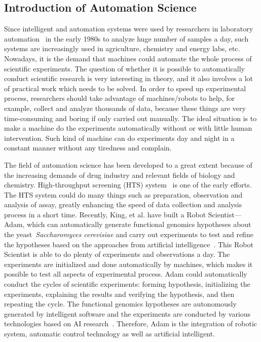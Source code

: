 \subsection{Introduction of Automation Science}

Since intelligent and automation systems were used by researchers in laboratory automation~\cite{Sasaki_1998} in the early 1980s to analyze huge number of samples a day, such systems are increasingly used in agriculture, chemistry and energy labs, etc. Nowadays, it is the demand that machines could automate the whole process of scientific experiments. The question of whether it is possible to automatically conduct scientific research is very interesting in theory, and it also involves a lot of practical work which needs to be solved. In order to speed up experimental process, researchers should take advantage of machines/robots to help, for example, collect and analyze thousands of data, because these things are very time-consuming and boring if only carried out manually. The ideal situation is to make a machine do the experiments automatically without or with little human intervention. Such kind of machine can do experiments day and night in a constant manner without any tiredness and complain.
          
The field of automation science has been developed to a great extent because of the increasing demands of drug industry and relevant fields of biology and chemistry. High-throughput screening (HTS) system~\cite{Persidis_1998} is one of the early efforts. The HTS system could do many things such as preparation, observation and analysis of assay, greatly enhancing the speed of data collection and analysis process in a short time. Recently, King, et al. have built a Robot Scientist---Adam,  which can automatically generate functional genomics hypotheses about the yeast~\textit{Saccharomyces cerevisiae} and carry out experiments to test and refine the hypotheses based on the approaches from artificial intelligence~\cite{King_2004, King_2009}. This Robot Scientist is able to do plenty of experiments and observations a day. The experiments are initialized and done automatically by machines, which makes it possible to test all aspects of experimental process. Adam could automatically conduct the cycles of scientific experiments: forming hypothesis, initializing the experiments, explaining the results and verifying the hypothesis, and then repeating the cycle. The functional genomics hypotheses are autonomously generated by intelligent software and the experiments are conducted by various technologies based on AI research~\cite{King_2004}. Therefore, Adam is the integration of robotic system, automatic control technology as well as artificial intelligent. 

